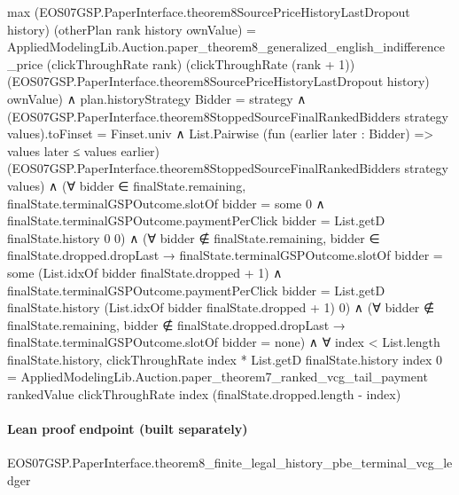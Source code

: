 \documentclass[10pt]{article}
\begin{document}
\begin{ReviewVerbatim}
                              max (EOS07GSP.PaperInterface.theorem8SourcePriceHistoryLastDropout history)
                                  (otherPlan rank history ownValue) =
                                AppliedModelingLib.Auction.paper_theorem8_generalized_english_indifference_price
                                  (clickThroughRate rank) (clickThroughRate (rank + 1))
                                  (EOS07GSP.PaperInterface.theorem8SourcePriceHistoryLastDropout history) ownValue) ∧
                    plan.historyStrategy Bidder = strategy ∧
                      (EOS07GSP.PaperInterface.theorem8StoppedSourceFinalRankedBidders strategy values).toFinset =
                          Finset.univ ∧
                        List.Pairwise (fun (earlier later : Bidder) => values later ≤ values earlier)
                            (EOS07GSP.PaperInterface.theorem8StoppedSourceFinalRankedBidders strategy values) ∧
                          (∀ bidder ∈ finalState.remaining,
                              finalState.terminalGSPOutcome.slotOf bidder = some 0 ∧
                                finalState.terminalGSPOutcome.paymentPerClick bidder =
                                  List.getD finalState.history 0 0) ∧
                            (∀ bidder ∉ finalState.remaining,
                                bidder ∈ finalState.dropped.dropLast →
                                  finalState.terminalGSPOutcome.slotOf bidder =
                                      some (List.idxOf bidder finalState.dropped + 1) ∧
                                    finalState.terminalGSPOutcome.paymentPerClick bidder =
                                      List.getD finalState.history (List.idxOf bidder finalState.dropped + 1) 0) ∧
                              (∀ bidder ∉ finalState.remaining,
                                  bidder ∉ finalState.dropped.dropLast →
                                    finalState.terminalGSPOutcome.slotOf bidder = none) ∧
                                ∀ index < List.length finalState.history,
                                  clickThroughRate index * List.getD finalState.history index 0 =
                                    AppliedModelingLib.Auction.paper_theorem7_ranked_vcg_tail_payment rankedValue
                                      clickThroughRate index (finalState.dropped.length - index)
\end{ReviewVerbatim}



\paragraph{Lean proof endpoint (built separately)}\begin{ReviewVerbatim}
EOS07GSP.PaperInterface.theorem8_finite_legal_history_pbe_terminal_vcg_ledger
\end{ReviewVerbatim}
\end{document}
